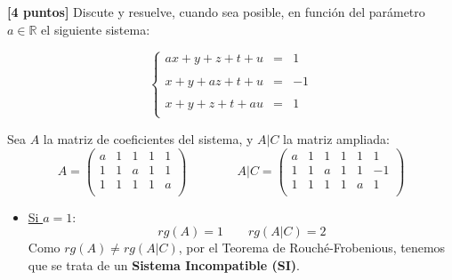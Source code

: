 \documentclass[12pt]{article}
\begin{document}
\begin{ejercicio}\textbf{[4 puntos]}
    Discute y resuelve, cuando sea posible, en función del parámetro $a\in \mathbb{R}$ el siguiente sistema:

    $$
        \left\{
        \begin{array}{rcl}
            ax + y + z + t + u &=& 1  \\
            \\
            x + y + az + t + u &=& -1  \\
            \\
            x + y + z + t + au &=& 1  \\
        \end{array}
        \right.
    $$

    Sea $A$ la matriz de coeficientes del sistema, y $A|C$ la matriz ampliada:
    \begin{equation*}
        A=\left(\begin{array}{ccccc}
            a & 1 & 1 & 1 & 1 \\
            1 & 1 & a & 1 & 1 \\
            1 & 1 & 1 & 1 & a \\
        \end{array}\right)
        \qquad \qquad
        A|C=\left(\begin{array}{cccccc}
            a & 1 & 1 & 1 & 1 & 1\\
            1 & 1 & a & 1 & 1 & -1\\
            1 & 1 & 1 & 1 & a & 1\\
        \end{array}\right)
    \end{equation*}
    \begin{itemize}
        \item \underline{Si $a=1$}:
        \begin{equation*}
            rg(A)=1 \qquad rg(A|C)=2
        \end{equation*}
        Como $rg(A)\neq rg(A|C)$, por el Teorema de Rouché-Frobenious, tenemos que se trata de un \textbf{Sistema Incompatible (SI)}.


\end{itemize}
\end{ejercicio}
\end{document}
